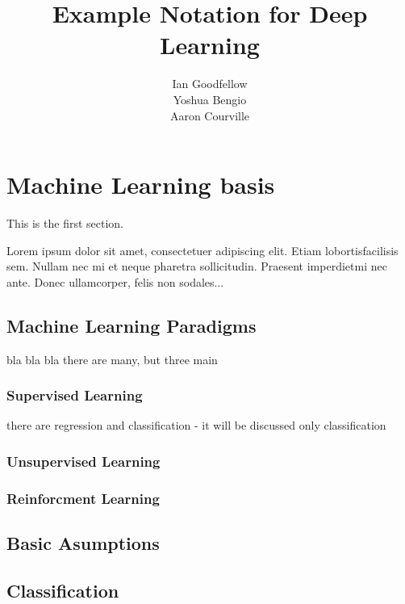 \documentclass[11pt,oneside,a4paper]{book}
\title{Example Notation for Deep Learning}
\author{Ian Goodfellow\\Yoshua Bengio\\Aaron Courville}
\date{}
\theoremstyle{definition}
\DeclareRobustCommand{\[}{\begin{equation}}
\DeclareRobustCommand{\]}{\end{equation}}
\begin{document}
\setlength{\parskip}{0.25 \baselineskip}
\newlength{\figwidth}
\setlength{\figwidth}{26pc}
\newlength{\notationgap}
\setlength{\notationgap}{1pc}

\frontmatter


\maketitle
\tableofcontents
{}

 
 \mainmatter
 
 
 \section{Machine Learning basis}


This is the first section.

Lorem  ipsum  dolor  sit  amet,  consectetuer  adipiscing  
elit.   Etiam  lobortisfacilisis sem.  Nullam nec mi et 
neque pharetra sollicitudin.  Praesent imperdietmi nec ante. 
Donec ullamcorper, felis non sodales...



\subsection{Machine Learning Paradigms}
bla bla bla there are many, but three main

\subsubsection{Supervised Learning}
there are regression and classification - it will be discussed only classification
\subsubsection{Unsupervised Learning}
\subsubsection{Reinforcment Learning}

\subsection{Basic Asumptions}
\subsection{Classification}
\end{document}

